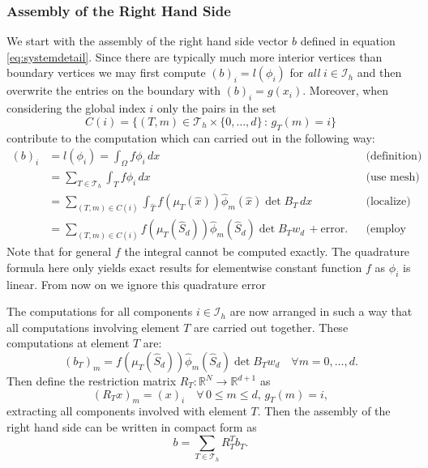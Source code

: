 \documentclass[a4paper,12pt]{article}
\begin{document}
\subsubsection*{Assembly of the Right Hand Side}

We start with the assembly of the right hand side vector $b$
defined in equation \eqref{eq:systemdetail}. Since there are typically much more 
interior vertices than boundary vertices we may first compute $(b)_i = l(\phi_i)$
for {\em all} $i\in\mathcal{I}_h$ and then overwrite the entries on the boundary
with $(b)_i = g(x_i)$. Moreover, when considering the global index $i$
only the pairs in the set
$$C(i) = \{(T,m)\in\mathcal{T}_h\times\{0,\ldots,d\} \,:\, g_T(m)=i\}$$
contribute to the computation which can carried out in the following way:
\begin{align*}
(b)_i &= l(\phi_i) = \int_\Omega f \phi_i\,dx &&\text{(definition)} \\
&= \sum_{T\in\mathcal{T}_h} \int_T f \phi_i\,dx &&\text{(use mesh)} \\
&= \sum_{(T,m)\in C(i)} \int_{\hat T} f(\mu_T(\hat x)) \hat\phi_m(\hat x) \det B_T\,dx 
&&\text{(localize)} \\
&= \sum_{(T,m)\in C(i)} 
f(\mu_T(\hat S_d)) \hat\phi_m(\hat S_d) \det B_T w_d \, + \text{error}. &&\text{(employ quadrature)} 
\end{align*}
Note that for general $f$ the integral cannot be computed exactly. The
quadrature formula here only yields exact results for elementwise constant
function $f$ as $\phi_i$ is linear. From now on we ignore this quadrature error

The computations for all components $i\in\mathcal{I}_h$ are now arranged
in such a way that all computations involving element $T$ are carried out together.
These computations at element $T$ are:
\begin{equation}
(b_T)_m =  f(\mu_T(\hat S_d)) \hat\phi_m(\hat S_d) \det B_T w_d \quad \forall m=0,\ldots,d .
\label{eq:lambda_volume}
\end{equation}
Then define the restriction matrix 
$R_T : \mathbb{R}^N \to \mathbb{R}^{d+1}$ as
\begin{equation}
(R_T x)_m = (x)_i \quad \forall \,0\leq m \leq d, \,g_T(m)=i,
\end{equation}
extracting all components involved with element $T$. Then
the assembly of the right hand side can be written in compact form as
\begin{equation}
b = \sum_{T\in\mathcal{T}_h} R_T^T b_T .
\label{eq:rhsassembly}
\end{equation}
\end{document}
